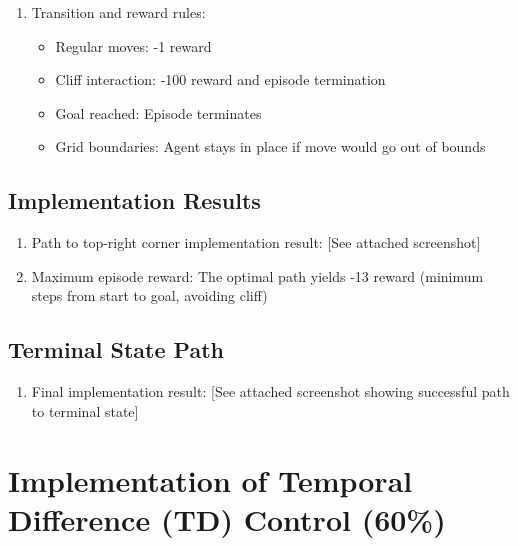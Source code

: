 \documentclass{article}
\begin{document}
\begin{enumerate}[label=(\arabic*)]
\item Transition and reward rules:
\begin{itemize}
    \item Regular moves: -1 reward
    \item Cliff interaction: -100 reward and episode termination
    \item Goal reached: Episode terminates
    \item Grid boundaries: Agent stays in place if move would go out of bounds
\end{itemize}
\end{enumerate}

\subsection{Implementation Results}
\begin{enumerate}[label=(\arabic*)]
\item Path to top-right corner implementation result: [See attached screenshot]

\item Maximum episode reward:
The optimal path yields -13 reward (minimum steps from start to goal, avoiding cliff)
\end{enumerate}

\subsection{Terminal State Path}
\begin{enumerate}[label=(\arabic*)]
\item Final implementation result: [See attached screenshot showing successful path to terminal state]
\end{enumerate}

\section{Implementation of Temporal Difference (TD) Control (60\%)}
\end{document}
